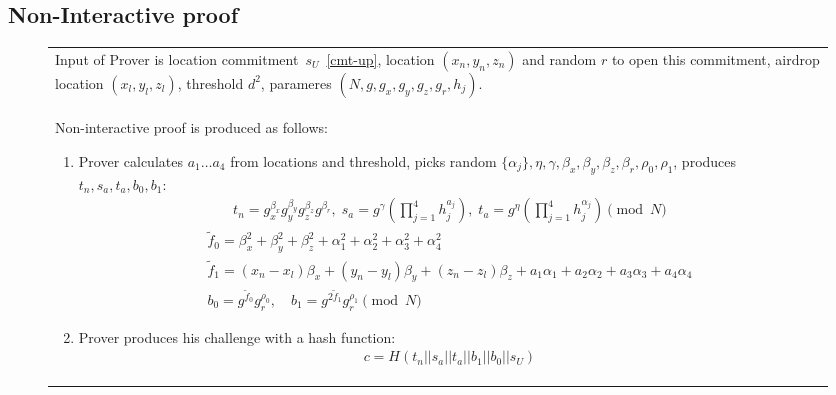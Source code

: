 \documentclass{article}
\begin{document}
\subsection {Non-Interactive proof}
\begin{figure}[!htb]
\begin{tabular}{|p{\linewidth}|}
\hline

Input of Prover is
  location commitment~$s_U$~\eqref{cmt-up},
  location $(x_n, y_n, z_n)$ and random $r$ to open this commitment,
  airdrop location $(x_l, y_l, z_l)$,
  threshold $d^2$,
  parameres $(N, g, g_x, g_y, g_z, g_r, h_j)$.
\\
Non-interactive proof is produced as follows:
\begin{enumerate}
\item
  Prover calculates $a_1 \dots a_4$ from locations and threshold,
  picks random $\{\alpha_j\}, \eta, \gamma, \beta_x, \beta_y, \beta_z, \beta_r, \rho_0, \rho_1$,
  produces $t_n, s_a, t_a, b_0, b_1$:
\begin{gather}
  t_n = g_x^{\beta_x} g_y^{\beta_y} g_z^{\beta_z} g^{\beta_r}, \;
  s_a = g^{\gamma} (\prod_{j=1}^4 h_j^{a_j}),  \;
  t_a = g^{\eta} (\prod_{j=1}^4 h_j^{\alpha_j}) \pmod{N}
\end{gather}
\begin{gather}
  \tilde f_0 = \beta_x^2 + \beta_y^2 +\beta_z^2 + \alpha_1^2 + \alpha_2^2 + \alpha_3^2 + \alpha_4^2  \\
  \tilde f_1 = (x_n - x_l) \beta_x  + (y_n - y_l) \beta_y  + (z_n - z_l) \beta_z + a_1 \alpha_1 + a_2 \alpha_2 + a_3 \alpha_3 + a_4 \alpha_4 \\
  b_0 = g^{\tilde f_0} g_r^{\rho_0},   \quad
  b_1 = g^{2 \tilde f_1} g_r^{\rho_1} \pmod{N}
\end{gather}

\item
  Prover produces his challenge with a hash function:
\begin{gather}
  c = H(t_n || s_a || t_a || b_1 || b_0 || s_U)
\end{gather}


\end{enumerate}
\end{tabular}
\end{figure}
\end{document}
